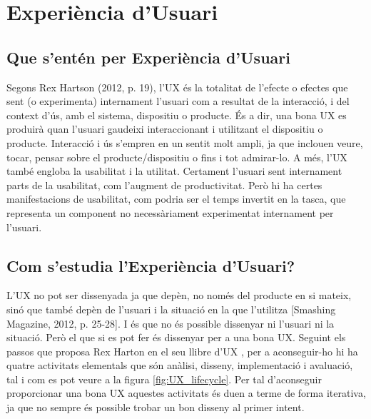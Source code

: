 
\chapter{Experiència d'Usuari}
\section{Que s'entén per Experiència d'Usuari}
Segons Rex Hartson (2012, p. 19)\cite{UX_Book}, l'\ac{UX} és la totalitat de l'efecte o efectes que sent (o experimenta) internament l'usuari com a resultat de la interacció, i del context d'ús, amb el sistema, dispositiu o producte. És a dir, una bona \ac{UX} es produirà quan l'usuari gaudeixi interaccionant i utilitzant el dispositiu o producte. Interacció i ús s'empren en un sentit molt ampli, ja que inclouen veure, tocar, pensar sobre el producte/dispositiu o fins i tot admirar-lo. 
A més, l'\ac{UX} també engloba la usabilitat i la utilitat. Certament l'usuari sent internament parts de la usabilitat, com l'augment de productivitat. Però hi ha certes manifestacions de usabilitat, com podria ser el temps invertit en la tasca, que representa un component no necessàriament experimentat internament per l'usuari.

\section{Com s'estudia l'Experiència d'Usuari?}
L'\ac{UX} no pot ser dissenyada ja que depèn, no només del producte en si mateix, sinó que també depèn de l'usuari i la situació en la que l'utilitza [Smashing Magazine, 2012, p. 25-28]\cite{Smashing_User_Experience_Design}. I és que no és possible dissenyar ni l'usuari ni la situació. Però el que si es pot fer és dissenyar per a una bona \ac{UX}. Seguint els passos que proposa Rex Harton en el seu llibre d'\ac{UX} \cite{UX_Book}, per a aconseguir-ho hi ha quatre activitats elementals que són anàlisi, disseny, implementació i avaluació, tal i com es pot veure a la figura \ref{fig:UX_lifecycle}. Per tal d'aconseguir proporcionar una bona \ac{UX} aquestes activitats és duen a terme de forma iterativa, ja que no sempre és possible trobar un bon disseny al primer intent.


